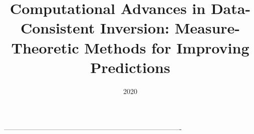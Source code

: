 \documentclass[english,10pt]{ucdenver-dissertation}
\title{Computational Advances in Data-Consistent Inversion: Measure-Theoretic Methods for Improving Predictions}
\date{2020}
\begin{document}


\pagebreak
\FloatBarrier

% 


\pagebreak
\FloatBarrier


\pagebreak
\FloatBarrier


\pagebreak
\FloatBarrier


\pagebreak
\FloatBarrier
---------------------------------------------------------------------------- %
\renewcommand\bibname{REFERENCES}
\singlespacing

\nocite{*}



\doublespacing

\ucdappendix

%







\end{document}
